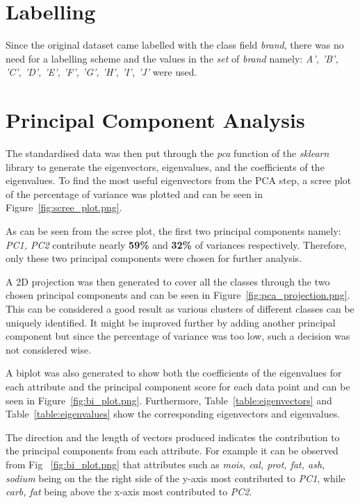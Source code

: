 \documentclass[preprint,12pt]{elsarticle}
\begin{document}
\section{Labelling}
\label{ss:Labelling}
Since the original dataset came labelled with the class field \textit{brand}, there was no need for a labelling scheme and the values in the \textit{set} of \textit{brand} namely:
\textit{A', 'B', 'C', 'D', 'E', 'F', 'G', 'H', 'I', 'J'} were used.

\section{Principal Component Analysis}
\label{ss:PrincipalComponentAnalysis}
The standardised data was then put through the \textit{pca} function of the \textit{sklearn} library \cite{pca2020} to generate the eigenvectors, eigenvalues, and the coefficients
of the eigenvalues. To find the most useful eigenvectors from the PCA step, a scree plot of the percentage of variance was plotted and can be seen in Figure~\ref{fig:scree_plot.png}.
\par
As can be seen from the scree plot, the first two principal components namely: \textit{PC1, PC2} contribute nearly \textbf{59\% }and \textbf{32\% }of variances respectively.
Therefore, only these two principal components were chosen for further analysis.
\par
A 2D projection was then generated to cover all the classes through the two chosen principal components and can be seen in Figure~\ref{fig:pca_projection.png}.
This can be considered a good result as various clusters of different classes can be uniquely identified. It might be improved further by adding another principal component
but since the percentage of variance was too low, such a decision was not considered wise.
\par
A biplot was also generated to show both the coefficients of the eigenvalues for each attribute and the principal component score for each data point and can be
seen in Figure~\ref{fig:bi_plot.png}. Furthermore, Table~\ref{table:eigenvectors} and Table~\ref{table:eigenvalues} show the corresponding eigenvectors and eigenvalues.
\par
The direction and the length of vectors produced indicates the contribution to the principal components from each attribute. For example it can be observed from Fig ~\ref{fig:bi_plot.png} that attributes such as \textit{mois, cal, prot, fat, ash, sodium} being on the the right side of the y-axis most contributed to \textit{PC1}, while
\textit{carb, fat} being above the x-axis most contributed to \textit{PC2}.
\end{document}
